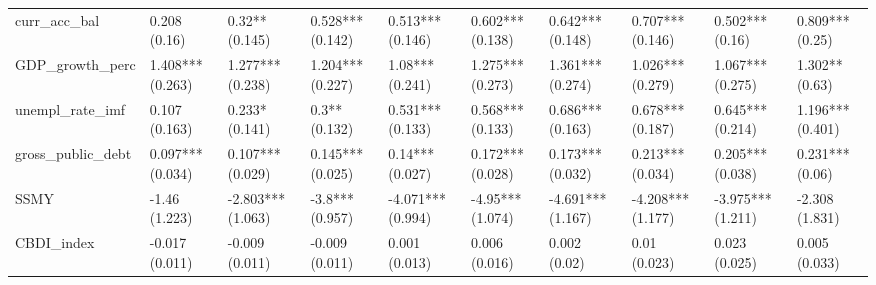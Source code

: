 \begin{table}[ht]
\begin{tabular}{llllllllll}
  curr\_acc\_bal & 0.208 (0.16) & 0.32** (0.145) & 0.528*** (0.142) & 0.513*** (0.146) & 0.602*** (0.138) & 0.642*** (0.148) & 0.707*** (0.146) & 0.502*** (0.16) & 0.809*** (0.25) \\ 
  GDP\_growth\_perc & 1.408*** (0.263) & 1.277*** (0.238) & 1.204*** (0.227) & 1.08*** (0.241) & 1.275*** (0.273) & 1.361*** (0.274) & 1.026*** (0.279) & 1.067*** (0.275) & 1.302** (0.63) \\ 
  unempl\_rate\_imf & 0.107 (0.163) & 0.233* (0.141) & 0.3** (0.132) & 0.531*** (0.133) & 0.568*** (0.133) & 0.686*** (0.163) & 0.678*** (0.187) & 0.645*** (0.214) & 1.196*** (0.401) \\ 
  gross\_public\_debt & 0.097*** (0.034) & 0.107*** (0.029) & 0.145*** (0.025) & 0.14*** (0.027) & 0.172*** (0.028) & 0.173*** (0.032) & 0.213*** (0.034) & 0.205*** (0.038) & 0.231*** (0.06) \\ 
  SSMY & -1.46 (1.223) & -2.803*** (1.063) & -3.8*** (0.957) & -4.071*** (0.994) & -4.95*** (1.074) & -4.691*** (1.167) & -4.208*** (1.177) & -3.975*** (1.211) & -2.308 (1.831) \\ 
  CBDI\_index & -0.017 (0.011) & -0.009 (0.011) & -0.009 (0.011) & 0.001 (0.013) & 0.006 (0.016) & 0.002 (0.02) & 0.01 (0.023) & 0.023 (0.025) & 0.005 (0.033) \\ 
   \bottomrule
\end{tabular}
\endgroup
\end{table}
